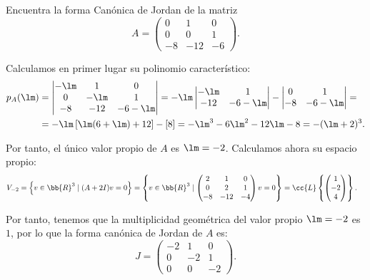 \documentclass[12pt]{article}
\begin{document}
    \begin{ejercicio}
    Encuentra la forma Canónica de Jordan de la matriz
    \begin{equation*}
        A=\begin{pmatrix}
            0 & 1 & 0\\
            0 & 0 & 1\\
            -8 & -12 & -6
        \end{pmatrix}.
    \end{equation*}

    Calculamos en primer lugar su polinomio característico:
    \begin{align*}
        p_A(\lm)&=\begin{vmatrix}
            -\lm & 1 & 0\\
            0 & -\lm & 1\\
            -8 & -12 & -6-\lm
        \end{vmatrix}
        =-\lm\begin{vmatrix}
            -\lm & 1\\
            -12 & -6-\lm
        \end{vmatrix}
        -\begin{vmatrix}
            0 & 1\\
            -8 & -6-\lm
        \end{vmatrix}
        =\\&=-\lm\left[\lm(6+\lm)+12\right]-\left[8\right]
        =-\lm^3-6\lm^2-12\lm-8
        =-(\lm+2)^3.
    \end{align*}

    Por tanto, el único valor propio de $A$ es $\lm=-2$. Calculamos ahora su espacio propio:
    \begin{align*}
        V_{-2} &= \left\{v\in\bb{R}^3\mid (A+2I)v=0\right\}
        =\left\{v\in\bb{R}^3\mid \begin{pmatrix}
            2 & 1 & 0\\
            0 & 2 & 1\\
            -8 & -12 & -4
        \end{pmatrix}v=0\right\}
        =\cc{L}\left\{\begin{pmatrix}
            1\\
            -2\\
            4
        \end{pmatrix}\right\}.
    \end{align*}

    Por tanto, tenemos que la multiplicidad geométrica del valor propio $\lm=-2$ es $1$, por lo que la forma canónica de Jordan de $A$ es:
    \begin{equation*}
        J=\begin{pmatrix}
            -2 & 1 & 0\\
            0 & -2 & 1\\
            0 & 0 & -2
        \end{pmatrix}.
    \end{equation*}
    \end{ejercicio}
\end{document}
